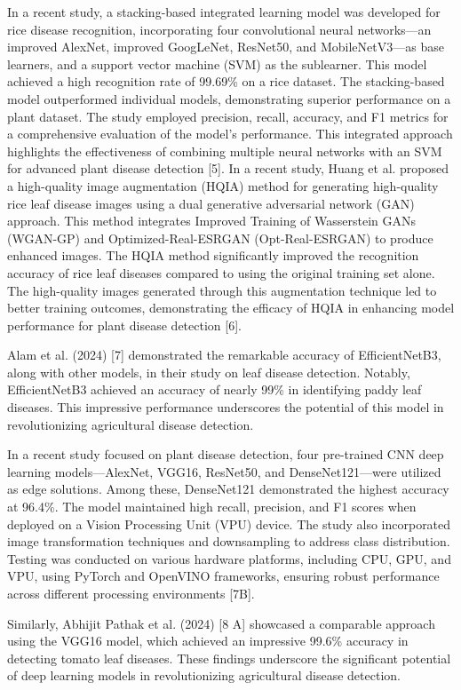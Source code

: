 \documentclass[conference]{IEEEtran}
\begin{document}
In a recent study, a stacking-based integrated learning model was developed for rice disease recognition, incorporating four convolutional neural networks—an improved AlexNet, improved GoogLeNet, ResNet50, and MobileNetV3—as base learners, and a support vector machine (SVM) as the sublearner. This model achieved a high recognition rate of 99.69\% on a rice dataset. The stacking-based model outperformed individual models, demonstrating superior performance on a plant dataset. The study employed precision, recall, accuracy, and F1 metrics for a comprehensive evaluation of the model's performance. This integrated approach highlights the effectiveness of combining multiple neural networks with an SVM for advanced plant disease detection [5].
In a recent study, Huang et al. proposed a high-quality image augmentation (HQIA) method for generating high-quality rice leaf disease images using a dual generative adversarial network (GAN) approach. This method integrates Improved Training of Wasserstein GANs (WGAN-GP) and Optimized-Real-ESRGAN (Opt-Real-ESRGAN) to produce enhanced images. The HQIA method significantly improved the recognition accuracy of rice leaf diseases compared to using the original training set alone. The high-quality images generated through this augmentation technique led to better training outcomes, demonstrating the efficacy of HQIA in enhancing model performance for plant disease detection [6].

Alam et al. (2024) [7] demonstrated the remarkable accuracy of EfficientNetB3, along with other models, in their study on leaf disease detection. Notably, EfficientNetB3 achieved an accuracy of nearly 99\% in identifying paddy leaf diseases. This impressive performance underscores the potential of this model in revolutionizing agricultural disease detection.

In a recent study focused on plant disease detection, four pre-trained CNN deep learning models—AlexNet, VGG16, ResNet50, and DenseNet121—were utilized as edge solutions. Among these, DenseNet121 demonstrated the highest accuracy at 96.4\%. The model maintained high recall, precision, and F1 scores when deployed on a Vision Processing Unit (VPU) device. The study also incorporated image transformation techniques and downsampling to address class distribution. Testing was conducted on various hardware platforms, including CPU, GPU, and VPU, using PyTorch and OpenVINO frameworks, ensuring robust performance across different processing environments [7B].

Similarly, Abhijit Pathak et al. (2024) [8 A] showcased a comparable approach using the VGG16 model, which achieved an impressive 99.6\% accuracy in detecting tomato leaf diseases. These findings underscore the significant potential of deep learning models in revolutionizing agricultural disease detection.
\end{document}

